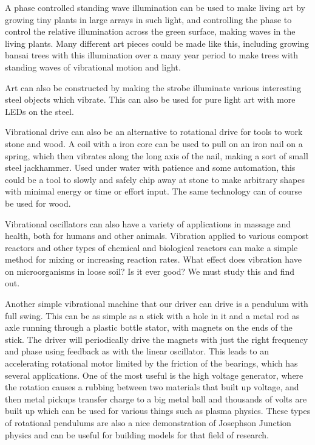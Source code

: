 A phase controlled standing wave illumination can be used to make living
art by growing tiny plants in large arrays in such light, and
controlling the phase to control the relative illumination across the
green surface, making waves in the living plants. Many different art
pieces could be made like this, including growing bansai trees with this
illumination over a many year period to make trees with standing waves
of vibrational motion and light.

Art can also be constructed by making the strobe illuminate various
interesting steel objects which vibrate. This can also be used for pure
light art with more LEDs on the steel.

Vibrational drive can also be an alternative to rotational drive for
tools to work stone and wood. A coil with a iron core can be used to
pull on an iron nail on a spring, which then vibrates along the long
axis of the nail, making a sort of small steel jackhammer. Used under
water with patience and some automation, this could be a tool to slowly
and safely chip away at stone to make arbitrary shapes with minimal
energy or time or effort input. The same technology can of course be
used for wood.

Vibrational oscillators can also have a variety of applications in
massage and health, both for humans and other animals. Vibration applied
to various compost reactors and other types of chemical and biological
reactors can make a simple method for mixing or increasing reaction
rates. What effect does vibration have on microorganisms in loose soil?
Is it ever good? We must study this and find out.

Another simple vibrational machine that our driver can drive is a
pendulum with full swing. This can be as simple as a stick with a hole
in it and a metal rod as axle running through a plastic bottle stator,
with magnets on the ends of the stick. The driver will periodically
drive the magnets with just the right frequency and phase using feedback
as with the linear oscillator. This leads to an accelerating rotational
motor limited by the friction of the bearings, which has several
applications. One of the most useful is the high voltage generator,
where the rotation causes a rubbing between two materials that built up
voltage, and then metal pickups transfer charge to a big metal ball and
thousands of volts are built up which can be used for various things
such as plasma physics. These types of rotational pendulums are also a
nice demonstration of Josephson Junction physics and can be useful for
building models for that field of research.

